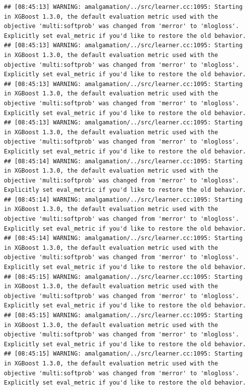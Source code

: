 \documentclass[
]{scrbook}
\begin{document}
\begin{verbatim}
## [08:45:13] WARNING: amalgamation/../src/learner.cc:1095: Starting in XGBoost 1.3.0, the default evaluation metric used with the objective 'multi:softprob' was changed from 'merror' to 'mlogloss'. Explicitly set eval_metric if you'd like to restore the old behavior.
## [08:45:13] WARNING: amalgamation/../src/learner.cc:1095: Starting in XGBoost 1.3.0, the default evaluation metric used with the objective 'multi:softprob' was changed from 'merror' to 'mlogloss'. Explicitly set eval_metric if you'd like to restore the old behavior.
## [08:45:13] WARNING: amalgamation/../src/learner.cc:1095: Starting in XGBoost 1.3.0, the default evaluation metric used with the objective 'multi:softprob' was changed from 'merror' to 'mlogloss'. Explicitly set eval_metric if you'd like to restore the old behavior.
## [08:45:13] WARNING: amalgamation/../src/learner.cc:1095: Starting in XGBoost 1.3.0, the default evaluation metric used with the objective 'multi:softprob' was changed from 'merror' to 'mlogloss'. Explicitly set eval_metric if you'd like to restore the old behavior.
## [08:45:14] WARNING: amalgamation/../src/learner.cc:1095: Starting in XGBoost 1.3.0, the default evaluation metric used with the objective 'multi:softprob' was changed from 'merror' to 'mlogloss'. Explicitly set eval_metric if you'd like to restore the old behavior.
## [08:45:14] WARNING: amalgamation/../src/learner.cc:1095: Starting in XGBoost 1.3.0, the default evaluation metric used with the objective 'multi:softprob' was changed from 'merror' to 'mlogloss'. Explicitly set eval_metric if you'd like to restore the old behavior.
## [08:45:14] WARNING: amalgamation/../src/learner.cc:1095: Starting in XGBoost 1.3.0, the default evaluation metric used with the objective 'multi:softprob' was changed from 'merror' to 'mlogloss'. Explicitly set eval_metric if you'd like to restore the old behavior.
## [08:45:15] WARNING: amalgamation/../src/learner.cc:1095: Starting in XGBoost 1.3.0, the default evaluation metric used with the objective 'multi:softprob' was changed from 'merror' to 'mlogloss'. Explicitly set eval_metric if you'd like to restore the old behavior.
## [08:45:15] WARNING: amalgamation/../src/learner.cc:1095: Starting in XGBoost 1.3.0, the default evaluation metric used with the objective 'multi:softprob' was changed from 'merror' to 'mlogloss'. Explicitly set eval_metric if you'd like to restore the old behavior.
## [08:45:15] WARNING: amalgamation/../src/learner.cc:1095: Starting in XGBoost 1.3.0, the default evaluation metric used with the objective 'multi:softprob' was changed from 'merror' to 'mlogloss'. Explicitly set eval_metric if you'd like to restore the old behavior.

\end{verbatim}
\end{document}
